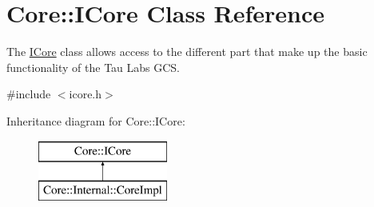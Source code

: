 \hypertarget{class_core_1_1_i_core}{\section{\-Core\-:\-:\-I\-Core \-Class \-Reference}
\label{class_core_1_1_i_core}
}


\-The \hyperlink{class_core_1_1_i_core}{\-I\-Core} class allows access to the different part that make up the basic functionality of the \-Tau \-Labs \-G\-C\-S.  




{\ttfamily \#include $<$icore.\-h$>$}

\-Inheritance diagram for \-Core\-:\-:\-I\-Core\-:\begin{figure}[H]
\begin{center}
\leavevmode
\includegraphics[height=2.000000cm]{class_core_1_1_i_core}
\end{center}
\end{figure}
